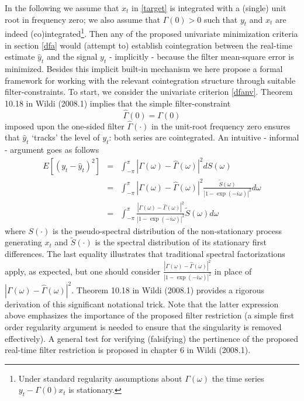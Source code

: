 \documentclass[11pt]{article}
\begin{document}
In the following we assume that $x_t$ in \ref{target} is integrated with a (single) unit root in frequency zero; we also assume that  $\Gamma(0)>0$ such that $y_t$ and $x_t$ are indeed (co)integrated\footnote{Under standard regularity assumptions about $\Gamma(\omega)$ the time series $y_t-\Gamma(0)x_t$ is stationary.}. Then any of the proposed univariate minimization criteria in section \ref{dfa} would (attempt to) establish cointegration between the real-time estimate $\hat{y}_t$ and the signal $y_t$ - implicitly - because the filter mean-square error is minimized. Besides this implicit built-in mechanism we here propose a formal framework for working with the relevant cointegration structure through suitable filter-constraints. To start, we consider the univariate criterion \ref{dfanv}. Theorem 10.18 in Wildi (2008.1) implies that the simple filter-constraint
\[\hat{\Gamma}(0)=\Gamma(0)\]
imposed upon the one-sided filter $\hat{\Gamma}(\cdot)$ in the unit-root frequency zero ensures that $\hat{y}_t$ `tracks' the level of $y_t$: both series are cointegrated. An intuitive - informal - argument goes as follows
\begin{eqnarray*}
E[(y_t-\hat{y}_t)^2]&=&\int_{-\pi}^\pi|\Gamma(\omega)-\hat{\Gamma}(\omega)|^2 dS(\omega)\\
&=&\int_{-\pi}^\pi|\Gamma(\omega)-\hat{\Gamma}(\omega)|^2 \frac{\tilde{S}(\omega)}{|1-\exp(-i\omega)|^2}d\omega\\
&=&\int_{-\pi}^\pi\frac{|\Gamma(\omega)-\hat{\Gamma}(\omega)|^2 }{|1-\exp(-i\omega)|^2} \tilde{S}(\omega)d\omega
\end{eqnarray*}
where $S(\cdot)$ is the pseudo-spectral distribution of the non-stationary process generating $x_t$ and $\tilde{S}(\cdot)$ is the spectral distribution of its stationary first differences. The last equality illustrates that traditional spectral factorizations apply, as expected, but one should consider $\frac{|\Gamma(\omega)-\hat{\Gamma}(\omega)|^2 }{|1-\exp(-i\omega)|^2}$ in place of $|\Gamma(\omega)-\hat{\Gamma}(\omega)|^2$. Theorem 10.18 in Wildi (2008.1) provides a rigorous derivation of this significant notational trick. Note that the latter expression above emphasizes the importance of the proposed filter restriction (a simple first order regularity argument is needed to ensure that the singularity is removed effectively). A general test for verifying (falsifying) the pertinence of the proposed real-time filter restriction is proposed in chapter 6 in Wildi (2008.1).  \\
\end{document}
